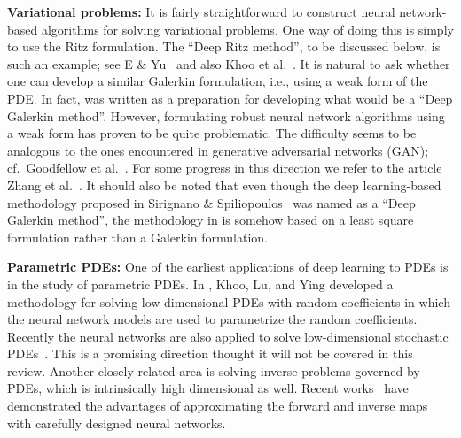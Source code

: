 \documentclass[12pt]{article}
\theoremstyle{definition}
\begin{document}
\vspace{.1in}   
\noindent
{\bf Variational problems:}
%
%
%
It is fairly straightforward to construct neural network-based algorithms for solving variational problems.  One way of doing this is
simply to use the Ritz formulation. The {``Deep Ritz} method'', to be discussed below, is such an example; 
see E \& Yu~\cite{E2018deep} and also Khoo et al.\ \cite{Khoo2019solving}.
It is natural to ask whether one can develop a similar Galerkin formulation,  i.e., 
using a weak form of the PDE. In fact, \cite{E2018deep} was written
as a preparation for developing what would be a ``Deep Galerkin method''. 
However, formulating robust neural network algorithms using
a weak form has proven to be quite problematic.  The difficulty seems to be analogous to the ones encountered in 
generative adversarial networks (GAN); cf.\ Goodfellow et al.\ \cite{Goodfellow2014generative}. 
For some progress in this direction we refer to the article Zhang et al.\ \cite{Zang2020weak}.
It should also be noted that even though the deep learning-based methodology proposed in 
Sirignano \& Spiliopoulos~\cite{Sirignano2018dgm} was named as a 
``Deep Galerkin method'', the methodology in \cite{Sirignano2018dgm} 
is somehow based on a least square formulation rather than a Galerkin formulation. 

\vspace{.1in}
\noindent
{\bf Parametric PDEs:}
One of the earliest applications of deep learning to PDEs is in the study of parametric PDEs.
In \cite{Khoo2020solving}, Khoo, Lu, and Ying developed a methodology for solving low dimensional
PDEs with random coefficients in which the neural network models are used to parametrize the random coefficients. Recently the neural networks are also applied to solve low-dimensional stochastic PDEs~\cite{zhang2020learning}.
This is a promising direction thought it will not be covered in this review.
Another closely related area is solving inverse problems governed by PDEs, which is intrinsically high dimensional as well. Recent works~\cite{raissi2019physics,fan2019solving,fan2020solving,khoo2019switchnet,chen2020physics} have demonstrated the advantages of approximating the forward and inverse maps with carefully designed neural networks.
\end{document}
